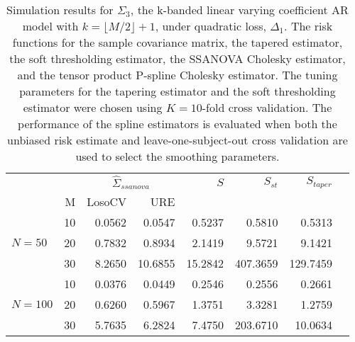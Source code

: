 \documentclass[12pt]{article}
\theoremstyle{definition}
\begin{document}
\begin{table}[ht]
\centering
\caption{Simulation results for $\Sigma_3$, the k-banded linear varying coefficient AR model with $k = \lfloor M/2\rfloor + 1$, under quadratic loss, $\Delta_1$. The risk functions for the sample covariance matrix, the tapered estimator, the soft thresholding estimator, the SSANOVA Cholesky estimator, and the tensor product P-spline Cholesky estimator. The tuning parameters for the tapering estimator and the soft thresholding estimator were chosen using $K = 10$-fold cross validation. The performance of the spline estimators is evaluated when both the unbiased risk estimate and leave-one-subject-out cross validation are used to select the smoothing parameters.}
\begin{tabular}{l|r|rrrrrr}
&  & \multicolumn{2}{c}{$\hat{\Sigma}_{ssanova}$} & $S$ & $S_{st}$ & $S_{taper}$ \\ 
&M & \mbox{LosoCV} & \mbox{URE} &  \\ 
  \hline
 	          &    10 & 0.0562 &	0.0547 & 0.5237 & 0.5810 & 0.5313 \\ 
 $N = 50$ 	 &     20 & 0.7832 & 0.8934   & 2.1419 & 9.5721 & 9.1421\\ 
  		  &    30 & 8.2650 & 10.6855  & 15.2842 & 407.3659 & 129.7459\\ \hdashline
		  &    10 & 0.0376 &0.0449	 & 0.2546  & 0.2556 & 0.2661\\ 
 $N = 100$  &    20 & 0.6260 & 0.5967	 & 1.3751 & 3.3281 & 1.2759\\ 
   &    30 & 5.7635 &	6.2824 & 7.4750& 203.6710 & 10.0634 \\ 
\end{tabular}
\end{table}

\end{document}
